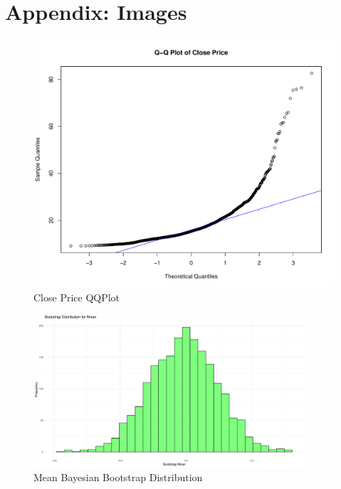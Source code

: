 \documentclass[12pt]{report} %
\begin{document}
\chapter{Appendix: Images}

\begin{figure}[ht]
    \centering
    \includegraphics[width=\textwidth]{QQPlot.pdf}
    \caption{Close Price QQPlot}
    \label{fig:QQPlot}
\end{figure}

\vspace{0.5cm}

\begin{figure}[ht]
    \centering
    \includegraphics[width=0.9\textwidth]{MeanBS.pdf}
    \caption{Mean Bayesian Bootstrap Distribution}
    \label{fig:meanBS}
\end{figure}

\vspace{0.3cm}
\end{document}
